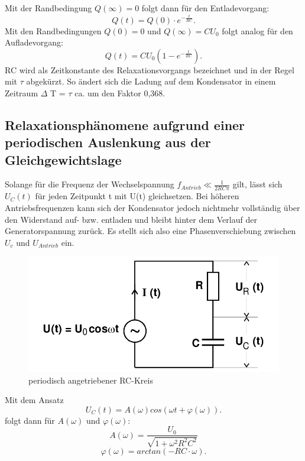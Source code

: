 Mit der Randbedingung $ Q(\infty)=0$ folgt dann für den Entladevorgang:
\begin{equation}
  Q(t) = Q(0) \cdot e^{-\frac{t}{RC}}\text{.}
\end{equation}
Mit den Randbedingungen $Q(0) = 0 $ und $Q(\infty) = CU_0$ folgt analog für
den Aufladevorgang:
\begin{equation}
  Q(t) = CU_0 \left(1-e^{-\frac{t}{RC}}\right)\text{.}
\end{equation}
RC wird als Zeitkonstante des Relaxationsvorgangs bezeichnet und in der Regel mit
 $\tau$ abgekürzt. So ändert sich die Ladung auf dem Kondensator in einem Zeitraum
 $\Delta$ T = $\tau$ ca. um den Faktor 0,368.

 \subsection{Relaxationsphänomene aufgrund einer periodischen Auslenkung aus der Gleichgewichtslage}

 Solange für die Frequenz der Wechselspannung $ f_{Antrieb} \ll \frac{1}{2RC\pi} $ gilt, lässt sich
 $U_C(t)$ für jeden Zeitpunkt t mit U(t) gleichsetzen. Bei höheren Antriebsfrequenzen
 kann sich der Kondensator jedoch nichtmehr vollständig über den Widerstand
  auf- bzw. entladen und bleibt hinter dem Verlauf der Generatorspannung zurück.
  Es stellt sich also eine Phasenverschiebung zwischen $U_c$ und $U_{Antrieb}$ ein.

\begin{figure}[H]
  \centering

  \includegraphics[width=\linewidth-200pt,height=\textheight-200pt,keepaspectratio]{content/RC_Kreis2.png}
  \caption{periodisch angetriebener RC-Kreis}
  \label{fig:RC_Kreis2}
\end{figure}

  Mit dem Ansatz
  \begin{equation}
  U_C(t) = A(\omega)cos(\omega t+\varphi(\omega))\text{.}
  \end{equation}
  folgt dann für $A(\omega)$ und $\varphi(\omega)$:
  \begin{equation}
    A(\omega) = \frac{U_0}{\sqrt{1+\omega^2R^2C^2}}
  \end{equation}
  \begin{equation}
    \varphi(\omega) = arctan(-RC \cdot \omega)\text{.}
  \end{equation}

